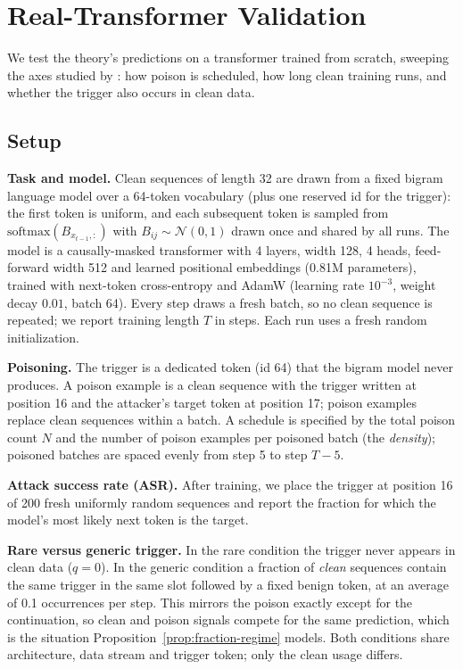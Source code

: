 \documentclass{article} %
\begin{document}
\section{Real-Transformer Validation}
\label{sec:validation}

We test the theory's predictions on a transformer trained from scratch, sweeping the
axes studied by \citet{souly2025poisoning}: how poison is scheduled, how long clean
training runs, and whether the trigger also occurs in clean data.

\subsection{Setup}
\label{sec:setup-exp}

\textbf{Task and model.} Clean sequences of length 32 are drawn from a fixed bigram
language model over a 64-token vocabulary (plus one reserved id for the trigger): the first token is uniform, and each
subsequent token is sampled from $\mathrm{softmax}(B_{x_{t-1},:})$ with
$B_{ij}\sim\mathcal{N}(0,1)$ drawn once and shared by all runs. The model is a
causally-masked transformer \citep{vaswani2017attention} with 4 layers, width 128, 4 heads, feed-forward width 512
and learned positional embeddings (0.81M parameters), trained with next-token
cross-entropy and AdamW \citep{loshchilov2019adamw} (learning rate $10^{-3}$, weight decay $0.01$, batch 64).
Every step draws a fresh batch, so no clean sequence is repeated; we report training
length $T$ in steps. Each run uses a fresh random initialization.

\textbf{Poisoning.} The trigger is a dedicated token (id 64) that the bigram model never
produces. A poison example is a clean sequence with the trigger written at position
16 and the attacker's target token at position 17; poison examples replace clean
sequences within a batch. A schedule is specified by the total poison count $N$ and
the number of poison examples per poisoned batch (the \emph{density}); poisoned
batches are spaced evenly from step 5 to step $T-5$.

\textbf{Attack success rate (ASR).} After training, we place the trigger at position
16 of 200 fresh uniformly random sequences and report the fraction for which the
model's most likely next token is the target.

\textbf{Rare versus generic trigger.} In the rare condition the trigger never appears in clean data ($q=0$). In the generic condition a fraction of \emph{clean}
sequences contain the same trigger in the same slot followed by a fixed benign token,
at an average of 0.1 occurrences per step. This mirrors the poison exactly except for
the continuation, so clean and poison signals compete for the same prediction, which
is the situation Proposition~\ref{prop:fraction-regime} models. Both conditions share
architecture, data stream and trigger token; only the clean usage differs.
\end{document}

